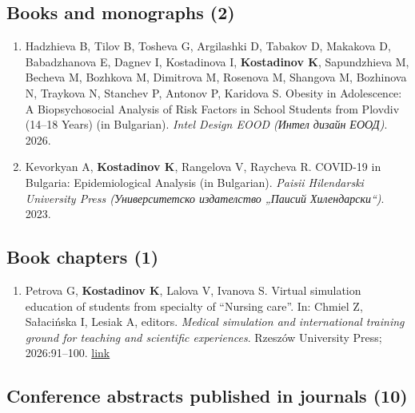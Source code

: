 \documentclass[
  10.5pt,
  a4paper,
  DIV=11,
  numbers=noendperiod]{scrartcl}
\providecommand{\tightlist}{%
  \setlength{\itemsep}{0pt}\setlength{\parskip}{0pt}}
\begin{document}
\subsection{Books and monographs (2)}\label{books-and-monographs-2}

\begin{enumerate}
\def\labelenumi{\arabic{enumi}.}
\setcounter{enumi}{49}
\item
  Hadzhieva B, Tilov B, Tosheva G, Argilashki D, Tabakov D, Makakova D,
  Babadzhanova E, Dagnev I, Kostadinova I, \textbf{Kostadinov K},
  Sapundzhieva M, Becheva M, Bozhkova M, Dimitrova M, Rosenova M,
  Shangova M, Bozhinova N, Traykova N, Stanchev P, Antonov P, Karidova
  S. Obesity in Adolescence: A Biopsychosocial Analysis of Risk Factors
  in School Students from Plovdiv (14--18 Years) (in Bulgarian).
  \emph{Intel Design EOOD (Интел дизайн ЕООД)}. 2026.
\item
  Kevorkyan A, \textbf{Kostadinov K}, Rangelova V, Raycheva R. COVID-19
  in Bulgaria: Epidemiological Analysis (in Bulgarian). \emph{Paisii
  Hilendarski University Press (Университетско издателство „Паисий
  Хилендарски``)}. 2023.
\end{enumerate}

\subsection{Book chapters (1)}\label{book-chapters-1}

\begin{enumerate}
\def\labelenumi{\arabic{enumi}.}
\setcounter{enumi}{51}
\tightlist
\item
  Petrova G, \textbf{Kostadinov K}, Lalova V, Ivanova S. Virtual
  simulation education of students from specialty of ``Nursing care''.
  In: Chmiel Z, Sałacińska I, Lesiak A, editors. \emph{Medical
  simulation and international training ground for teaching and
  scientific experiences}. Rzeszów University Press; 2026:91--100.
  \href{https://repozytorium.ur.edu.pl/handle/item/12607}{link}
\end{enumerate}

\subsection{Conference abstracts published in journals
(10)}\label{conference-abstracts-published-in-journals-10}
\end{document}
